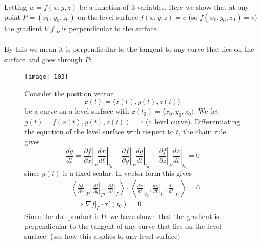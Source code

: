 \documentclass{report}
\begin{document}
Letting $w=f(x,y,z)$ be a function of 3 variables. Here we show that at any point $P=(x_0,y_0,z_0)$ on the 
level surface $f(x,y,z)=c$ (so $f(x_0,y_0,z_0)=c$) the 
gradient $\nabla f|_P$ is perpendicular to the surface.\\
\vspace{1mm}\\
By this we mean it is perpendicular to the tangent to any curve that lies on the surface and goes through $P$:
\begin{figure}[h]
\begin{center}
\texttt{[image: 103]}\\
\end{center}
Consider the position vector
\begin{equation*}
\bm{r}(t)=\langle x(t),y(t),z(t)\rangle
\end{equation*}
be a curve on a level surface with $\bm{r}(t_0)=\langle x_0,y_0,z_0\rangle$. 
We let $g(t)=f(x(t),y(t),z(t))=c$ (a level curve).
Differentiating the equation of the level surface with respect to $t$, the chain rule gives
\begin{equation*}
\frac{dg}{dt}=\left.\frac{\partial f}{\partial x}\right|_P
\left.\frac{dx}{dt}\right|_{t_0}+
\left.\frac{\partial f}{\partial y}\right|_P\left.\frac{dy}{dt}\right|_{t_0}+
\left.\frac{\partial f}{\partial z}\right|_P\left.\frac{dz}{dt}\right|_{t_0}=0
\end{equation*}
since $g(t)$ is a fixed scalar. In vector form this gives
\begin{align*}
&\left\langle\left.\frac{\partial f}{\partial x}\right|_P,
\left.\frac{\partial f}{\partial y}\right|_P,
\left.\frac{\partial f}{\partial z}\right|_P\right\rangle
\cdot\left\langle\left.\frac{dx}{dt}\right|_{t_0},
\left.\frac{dy}{dt}\right|_{t_0},
\left.\frac{dz}{dt}\right|_{t_0}\right\rangle=0\\
&\implies\nabla f|_P\cdot\bm{r}'(t_0)=0
\end{align*}
Since the dot product is 0, we have shown that the gradient is perpendicular to the tangent of any curve that
lies on the level surface. (see how this applies to
any level surface)
\end{figure}
\newpage

\subsection{}
\end{document}

